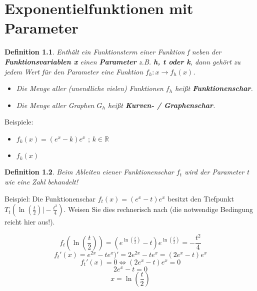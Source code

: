 \documentclass[a4paper]{book}
\newtheorem{definition}{Definition}
\begin{document}
\chapter{Exponentielfunktionen mit Parameter}

\begin{definition}
Enthält ein Funktionsterm einer Funktion f neben der \textbf{Funktionsvariablen x} einen \textbf{Parameter} z.B. \textbf{h, t oder k}, dann gehört  zu jedem Wert für den Parameter eine Funktion $f_h : x \rightarrow f_h(x)$.

\begin{itemize}
\item Die Menge aller (unendliche vielen) Funktionen $f_h$ heißt \textbf{Funktionenschar}.
\item Die Menge aller Graphen $G_h$ heißt \textbf{Kurven- / Graphenschar}.
\end{itemize}
\end{definition}

Beispiele:
\begin{itemize}
\item $f_k(x) = (e^x-k)e^x$ ; $k \in \mathbb{R}$
\item $f_k(x)$
\end{itemize}

\begin{definition}
Beim Ableiten eiener Funktionenschar $f_t$ wird der Parameter t wie eine Zahl behandelt!
\end{definition}
Beispiel: Die Funktionenschar $f_t(x) = (e^x-t)e^x$ besitzt den Tiefpunkt $T_t(\ln(\frac t2)\vert - \frac {t^2}4)$. Weisen Sie dies rechnerisch nach (die notwendige Bedingung reicht hier aus!).

\[f_t(\ln(\frac t2)) = (e^{\ln(\frac t2)}-t)e^{\ln(\frac t2)} = -\frac {t^2}4\]
\[f_t '(x) = e^{2x} - te^x)' = 2e^{2x} - t e^x = (2e^x - t) e^x\]
\[f_t ' (x) = 0  \Leftrightarrow  (2e^x - t) e^x = 0\]
\[2e^x - t = 0\]
\[x = \ln(\frac t2)\]
\end{document}
